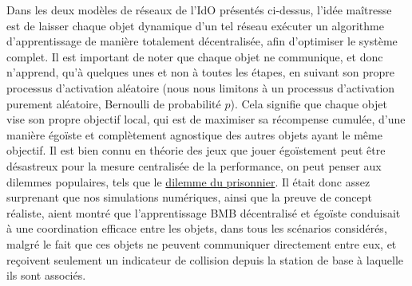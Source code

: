 \begin{resume_fr}
%
Dans les deux modèles de réseaux de l'IdO présentés ci-dessus, l'idée maîtresse est de laisser chaque objet dynamique d'un tel réseau exécuter un algorithme d'apprentissage de manière totalement décentralisée, afin d'optimiser le système complet.
Il est important de noter que chaque objet ne communique, et donc n'apprend, qu'à quelques unes et non à toutes les étapes, en suivant son propre processus d'activation aléatoire (nous nous limitons à un processus d'activation purement aléatoire, Bernoulli de probabilité $p$).
Cela signifie que chaque objet vise son propre objectif local, qui est de maximiser sa récompense cumulée, d'une manière égoïste et complètement agnostique des autres objets ayant le même objectif.
Il est bien connu en théorie des jeux que jouer égoïstement peut être désastreux pour la mesure centralisée de la performance, on peut penser aux \guillemotleft{} dilemmes \guillemotright{} populaires, tels que le \href{https://fr.wikipedia.org/wiki/Dilemme_du_prisonnier}{dilemme du prisonnier}.
Il était donc assez surprenant que nos simulations numériques, ainsi que la preuve de concept réaliste, aient montré que l'apprentissage BMB décentralisé et égoïste conduisait à une coordination efficace entre les objets, dans tous les scénarios considérés, malgré le fait que ces objets ne peuvent communiquer directement entre eux, et reçoivent seulement un indicateur de collision depuis la station de base à laquelle ils sont associés.


\end{resume_fr}
